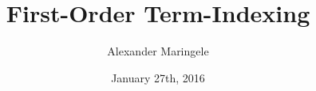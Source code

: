 



\author{Alexander Maringele}
\title{First-Order Term-Indexing
}
\date{January 27th, 2016}

%



















 
